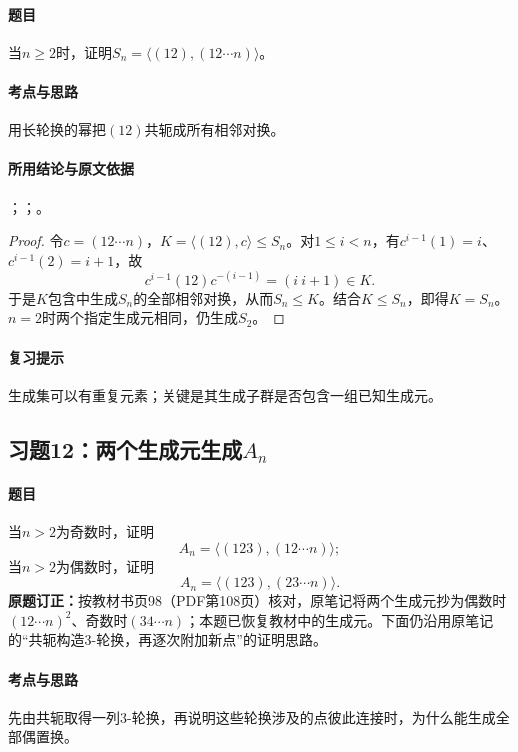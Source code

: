\paragraph{题目}
当$n\ge2$时，证明$S_n=\langle(12),(12\cdots n)\rangle$。

\paragraph{考点与思路}
用长轮换的幂把$(12)$共轭成所有相邻对换。

\paragraph{所用结论与原文依据}
；；。


\begin{proof}
令$c=(12\cdots n)$，$K=\langle(12),c\rangle\le S_n$。对$1\le i<n$，有$c^{i-1}(1)=i$、$c^{i-1}(2)=i+1$，故
\[
c^{i-1}(12)c^{-(i-1)}=(i\ i+1)\in K.
\]
于是$K$包含中生成$S_n$的全部相邻对换，从而$S_n\le K$。结合$K\le S_n$，即得$K=S_n$。$n=2$时两个指定生成元相同，仍生成$S_2$。
\end{proof}

\paragraph{复习提示}
生成集可以有重复元素；关键是其生成子群是否包含一组已知生成元。


\subsection{习题12：\texorpdfstring{两个生成元生成$A_n$}{两个生成元生成An}}
\label{ex:2:12}

\paragraph{题目}
当$n>2$为奇数时，证明
\[
A_n=\langle(123),(12\cdots n)\rangle;
\]
当$n>2$为偶数时，证明
\[
A_n=\langle(123),(23\cdots n)\rangle.
\]
\textbf{原题订正：}按教材书页98（PDF第108页）核对，原笔记将两个生成元抄为偶数时$(12\cdots n)^2$、奇数时$(34\cdots n)$；本题已恢复教材中的生成元。下面仍沿用原笔记的“共轭构造3-轮换，再逐次附加新点”的证明思路。

\paragraph{考点与思路}
先由共轭取得一列3-轮换，再说明这些轮换涉及的点彼此连接时，为什么能生成全部偶置换。


